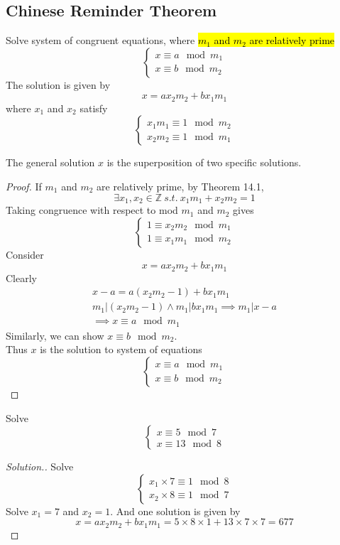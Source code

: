 \documentclass[10pt]{article}
\begin{document}
		\subsection{Chinese Reminder Theorem}
		\begin{theorem}
			Solve system of congruent equations, where \hl{$m_1$ and $m_2$ are relatively prime}
			\[
				\begin{cases}
					x \equiv a \mod m_1 \\
					x \equiv b \mod m_2
				\end{cases}
			\]
			The solution is given by 
			\[
				x = a x_2 m_2 + b x_1 m_1
			\]
			where $x_1$ and $x_2$ satisfy
			\[
				\begin{cases}
					x_1 m_1 \equiv 1 \mod m_2 \\
					x_2 m_2 \equiv 1 \mod m_1 
				\end{cases}
			\]
		\end{theorem}
		The general solution $x$ is the superposition of two specific solutions.
		
		\begin{proof}
			If $m_1$ and $m_2$ are relatively prime, by Theorem 14.1,
			\[
				\exists x_1, x_2 \in \mathbb{Z}\ s.t. \ x_1 m_1 + x_2 m_2 = 1
			\]
			Taking congruence with respect to mod $m_1$ and $m_2$ gives
			\[
				\begin{cases}
					1 \equiv x_2 m_2 \mod m_1 \\
					1 \equiv x_1 m_1 \mod m_2
				\end{cases}
			\]
			Consider 
			\[
				x = a x_2 m_2 + b x_1 m_1
			\]
			Clearly 
			\begin{gather*}
				x - a = a(x_2 m_2 - 1) + b x_1 m_1 \\
				m_1 | (x_2 m_2 - 1) \land m_1 | b x_1 m_1 \implies m_1 | x - a \\
				\implies x \equiv a \mod m_1
			\end{gather*}
			Similarly, we can show $x \equiv b \mod m_2$. \\
			Thus $x$ is the solution to system of equations 
			\[
				\begin{cases}
					x \equiv a \mod m_1 \\
					x \equiv b \mod m_2
				\end{cases}
			\]
		\end{proof}
		
		\begin{example}
			Solve
			\[
				\begin{cases}
					x \equiv 5 \mod 7 \\
					x \equiv 13 \mod 8
				\end{cases}
			\]
		\end{example}
		\begin{proof}[Solution.]
			Solve 
			\[
				\begin{cases}
					x_1 \times 7 \equiv 1 \mod 8 \\
					x_2 \times 8 \equiv 1 \mod 7
				\end{cases}
			\]
			Solve $x_1 = 7$ and $x_2 = 1$. And one solution is given by 
			\[
				x = a x_2 m_2 + b x_1 m_1 = 5 \times 8 \times 1 + 13 \times 7 \times 7 = 677
			\]
		\end{proof}
\end{document}
